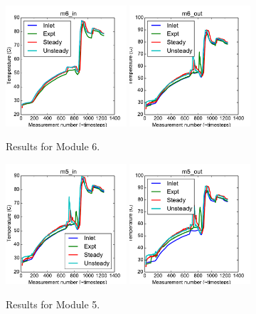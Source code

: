 \documentclass{article}
\begin{document}
\begin{figure}[!ht]
\centering
\includegraphics[width=0.4\textwidth]{../../data/ICSolar/images/Jan31_m6_in_compare.pdf}\hspace{0.05\textwidth}
\includegraphics[width=0.4\textwidth]{../../data/ICSolar/images/Jan31_m6_out_compare.pdf}\hspace{0.05\textwidth}\\
\caption{Results for Module 6.}\end{figure}
\begin{figure}[!ht]
\centering
\includegraphics[width=0.4\textwidth]{../../data/ICSolar/images/Jan31_m5_in_compare.pdf}\hspace{0.05\textwidth}
\includegraphics[width=0.4\textwidth]{../../data/ICSolar/images/Jan31_m5_out_compare.pdf}\hspace{0.05\textwidth}\\
\caption{Results for Module 5.}\end{figure}
\end{document}
